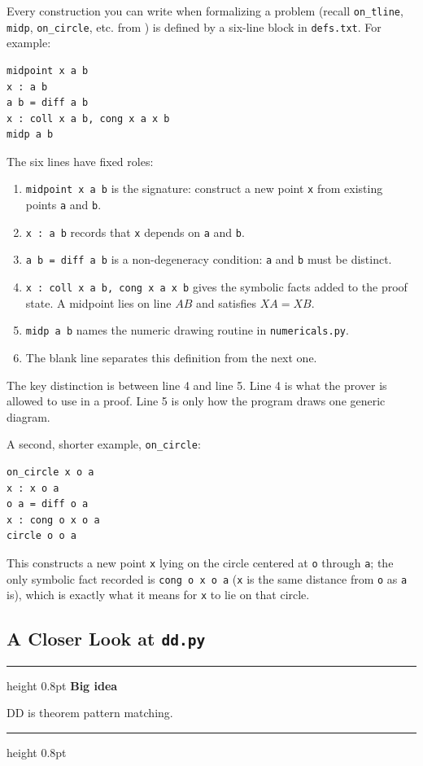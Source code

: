 \documentclass[reqno]{amsart}
\newenvironment{lecturebox}[1]{%
    \par\medskip
    \noindent\begingroup
    \setlength{\parindent}{0pt}
    \color{agblue}\hrule height 0.8pt\color{black}
    \smallskip
    \textbf{\color{agblue}#1}\par\smallskip
}{%
    \smallskip
    \color{agblue}\hrule height 0.8pt\color{black}
    \endgroup
    \medskip
}
\DeclareMathOperator{\1}{\textbf{1}}
\begin{document}
Every construction you can write when formalizing a problem (recall
\verb|on_tline|, \verb|midp|, \verb|on_circle|, etc. from )
is defined by a six-line block in \verb|defs.txt|. For example:
\begin{lstlisting}
midpoint x a b
x : a b
a b = diff a b
x : coll x a b, cong x a x b
midp a b

\end{lstlisting}
The six lines have fixed roles:
\begin{enumerate}
    \item \verb|midpoint x a b| is the signature: construct a new point
          \verb|x| from existing points \verb|a| and \verb|b|.
    \item \verb|x : a b| records that \verb|x| depends on \verb|a| and
          \verb|b|.
    \item \verb|a b = diff a b| is a non-degeneracy condition: \verb|a| and
          \verb|b| must be distinct.
    \item \verb|x : coll x a b, cong x a x b| gives the symbolic facts added
          to the proof state. A midpoint lies on line $AB$ and satisfies
          $XA=XB$.
    \item \verb|midp a b| names the numeric drawing routine in
          \verb|numericals.py|.
    \item The blank line separates this definition from the next one.
\end{enumerate}
The key distinction is between line 4 and line 5. Line 4 is what the prover is
allowed to use in a proof. Line 5 is only how the program draws one generic
diagram.

A second, shorter example, \verb|on_circle|:
\begin{lstlisting}
on_circle x o a
x : x o a
o a = diff o a
x : cong o x o a
circle o o a

\end{lstlisting}
This constructs a new point \verb|x| lying on the circle centered at
\verb|o| through \verb|a|; the only symbolic fact recorded is
\verb|cong o x o a| (\verb|x| is the same distance from \verb|o| as \verb|a|
is), which is exactly what it means for \verb|x| to lie on that circle.

\subsection{A Closer Look at \texttt{dd.py}}\label{sec: dd.py}

\begin{lecturebox}{Big idea}
DD is theorem pattern matching.
\end{lecturebox}
\end{document}
